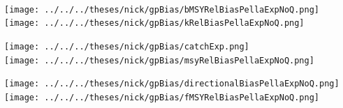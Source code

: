 \documentclass[ xcolor = pdftex, dvipsnames, table ]{beamer}
\begin{document}
%
\begin{frame}%
$~$
\hspace*{-1.25cm}
\begin{minipage}[h!]{0.33\textwidth}
\hspace*{0.25cm}
\texttt{[image: ../../../theses/nick/gpBias/bMSYRelBiasPellaExpNoQ.png]}\\
\hspace*{0.25cm}
\texttt{[image: ../../../theses/nick/gpBias/kRelBiasPellaExpNoQ.png]}
\end{minipage}
\begin{minipage}[h!]{0.33\textwidth}
\hspace*{0.75cm}
\texttt{[image: ../../../theses/nick/gpBias/catchExp.png]}\\
\hspace*{0.75cm}
\texttt{[image: ../../../theses/nick/gpBias/msyRelBiasPellaExpNoQ.png]}
\end{minipage}
\begin{minipage}[h!]{0.33\textwidth}
\hspace*{1cm}
\texttt{[image: ../../../theses/nick/gpBias/directionalBiasPellaExpNoQ.png]}\\
\hspace*{1cm}
\texttt{[image: ../../../theses/nick/gpBias/fMSYRelBiasPellaExpNoQ.png]}
\end{minipage}
\end{frame}
\end{document}
